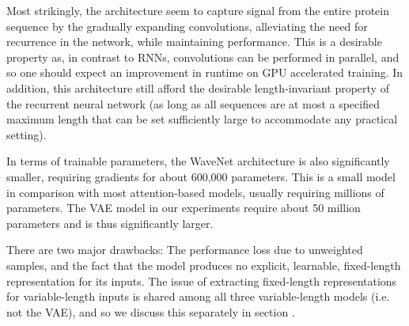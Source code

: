 Most strikingly, the architecture seem to capture signal from the entire protein sequence by the gradually expanding convolutions, alleviating the need for recurrence in the network, while maintaining performance. This is a desirable property as, in contrast to RNNs, convolutions can be performed in parallel, and so one should expect an improvement in runtime on GPU accelerated training. In addition, this architecture still afford the desirable length-invariant property of the recurrent neural network (as long as all sequences are at most a specified maximum length that can be set sufficiently large to accommodate any practical setting).

In terms of trainable parameters, the WaveNet architecture is also significantly smaller, requiring gradients for about 600,000 parameters. This is a small model in comparison with most attention-based models, usually requiring millions of parameters. The VAE model in our experiments require about 50 million parameters and is thus significantly larger. 


There are two major drawbacks: The performance loss due to unweighted samples, and the fact that the model produces no explicit, learnable, fixed-length representation for its inputs. The issue of extracting fixed-length representations for variable-length inputs is shared among all three variable-length models (i.e. not the VAE), and so we discuss this separately in section .



